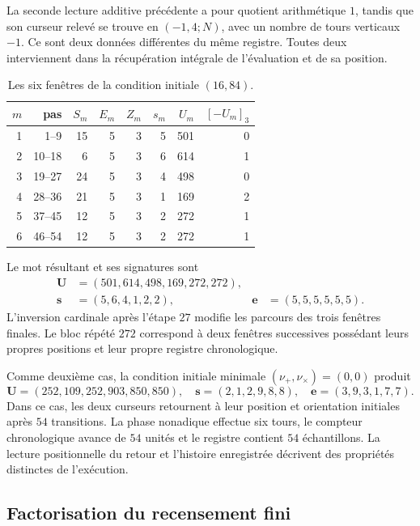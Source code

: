 La seconde lecture additive précédente a pour quotient arithmétique \(1\),
tandis que son curseur relevé se trouve en \((-1,4;N)\), avec un nombre de tours
verticaux \(-1\). Ce sont deux données différentes du même registre. Toutes deux
interviennent dans la récupération intégrale de l'évaluation et de sa position.

\begin{table}[htbp]
\caption{Les six fenêtres de la condition initiale \((16,84)\).}
\label{act21:tpk:tabla-seis501}
\begin{tabular}{@{}rrrrrrrr@{}}
\toprule
\(m\)&pas&\(S_m\)&\(E_m\)&\(Z_m\)&\(s_m\)&\(U_m\)&\([-U_m]_3\)\\
\midrule
1&1--9&15&5&3&5&501&0\\
2&10--18&6&5&3&6&614&1\\
3&19--27&24&5&3&4&498&0\\
4&28--36&21&5&3&1&169&2\\
5&37--45&12&5&3&2&272&1\\
6&46--54&12&5&3&2&272&1\\
\bottomrule
\end{tabular}
\end{table}

Le mot résultant et ses signatures sont
\begin{align*}
 \mathbf U&=(501,614,498,169,272,272),\\
 \mathbf s&=(5,6,4,1,2,2),&
 \mathbf e&=(5,5,5,5,5,5).
\end{align*}
L'inversion cardinale après l'étape \(27\) modifie les parcours des
trois fenêtres finales. Le bloc répété \(272\) correspond à deux
fenêtres successives possédant leurs propres positions et leur propre registre chronologique.

Comme deuxième cas, la condition initiale minimale \((\nu_+,\nu_\times)=(0,0)\)
produit
\[
 \mathbf U=(252,109,252,903,850,850),\quad
 \mathbf s=(2,1,2,9,8,8),\quad
 \mathbf e=(3,9,3,1,7,7).
\]
Dans ce cas, les deux curseurs retournent à leur position et orientation initiales
après \(54\) transitions. La phase nonadique effectue six tours, le
compteur chronologique avance de \(54\) unités et le registre contient
\(54\) échantillons. La lecture positionnelle du retour et
l'histoire enregistrée décrivent des propriétés distinctes de l'exécution.

\subsection{Factorisation du recensement fini}
\label{act21:tpk:censo}

